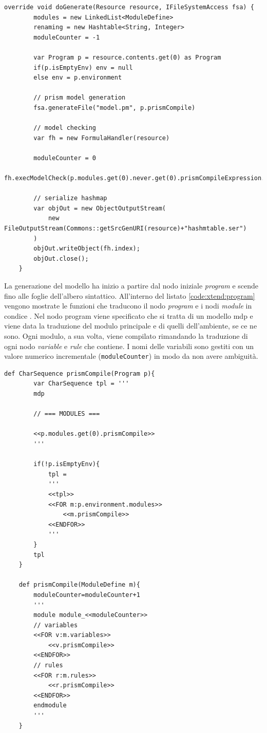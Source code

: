 \begin{lstlisting}[language=xtend,style=eclipse,caption={Implementazione della funzione di generazione in \xtend{}},label=code:xtend:generate]
	override void doGenerate(Resource resource, IFileSystemAccess fsa) {
		modules = new LinkedList<ModuleDefine>
		renaming = new Hashtable<String, Integer>
		moduleCounter = -1

		var Program p = resource.contents.get(0) as Program
		if(p.isEmptyEnv) env = null
		else env = p.environment

		// prism model generation
		fsa.generateFile("model.pm", p.prismCompile)

		// model checking
		var fh = new FormulaHandler(resource)
		
		moduleCounter = 0
		fh.execModelCheck(p.modules.get(0).never.get(0).prismCompileExpression.toString)
		
		// serialize hashmap
        var objOut = new ObjectOutputStream(
        	new FileOutputStream(Commons::getSrcGenURI(resource)+"hashmtable.ser")
        )
        objOut.writeObject(fh.index);
        objOut.close();
	}
\end{lstlisting}

\vspace{0.4cm}

La generazione del modello \prism{} ha inizio a partire dal nodo iniziale \emph{program} e scende fino alle foglie dell'albero sintattico. All'interno del listato \ref{code:xtend:program} vengono mostrate le funzioni che traducono il nodo \emph{program} e i nodi \emph{module} in condice \prism{}. Nel nodo program viene specificato che si tratta di un modello \ac{mdp} e viene data la traduzione del modulo principale e di quelli dell'ambiente, se ce ne sono. Ogni modulo, a sua volta, viene compilato rimandando la traduzione di ogni nodo \emph{variable} e \emph{rule} che contiene. I nomi delle variabili sono gestiti con un valore numerico incrementale (\texttt{moduleCounter}) in modo da non avere ambiguità.

\begin{lstlisting}[language=xtend,style=eclipse,caption={Generazione dei moduli in \xtend{}},label=code:xtend:program]
	def CharSequence prismCompile(Program p){
		var CharSequence tpl = '''
		mdp
		
		// === MODULES ===
		
		<<p.modules.get(0).prismCompile>>
		'''
		
		if(!p.isEmptyEnv){
			tpl = 
			'''
			<<tpl>>
			<<FOR m:p.environment.modules>>
				<<m.prismCompile>>
			<<ENDFOR>>
			'''
		}
		tpl
	}
		
	def prismCompile(ModuleDefine m){
		moduleCounter=moduleCounter+1
		'''
		module module_<<moduleCounter>>
		// variables
		<<FOR v:m.variables>>
			<<v.prismCompile>>
		<<ENDFOR>>
		// rules
		<<FOR r:m.rules>>
			<<r.prismCompile>>
		<<ENDFOR>>
		endmodule
		'''
	}
\end{lstlisting}

